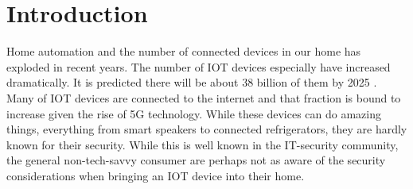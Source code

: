 \chapter{Introduction} \label{ch:intro}
% 
% 
% 


Home automation and the number of connected devices in our home has exploded in recent years. The number of \gls{IOT} devices especially have increased dramatically. It is predicted there will be about 38 billion of them by 2025 \cite{ieee-iot}. Many of \gls{IOT} devices are connected to the internet and that fraction is bound to increase given the rise of 5G technology. While these devices can do amazing things, everything from smart speakers to connected refrigerators, they are hardly known for their security. While this is well known in the IT-security community, the general non-tech-savvy consumer are perhaps not as aware of the security considerations when bringing an \gls{IOT} device into their home.

